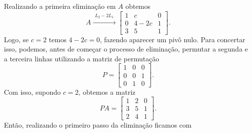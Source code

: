 \documentclass[leqno]{article}
\numberwithin{equation}{section}
\begin{document}
\begin{enumerate}
\begin{enumerate}
                    \begin{sol} 
                        Realizando a primeira eliminação em \( A \) obtemos
                        \begin{equation*}
                            A
                            \xrightarrow{
                                \begin{array}{l}
                                    L_{ 2 } - 2 L_{ 1 }
                                \end{array}
                            }
                            \begin{bmatrix}
                                1 & c & 0  \\
                                0 & 4 - 2 c & 1  \\
                                3 & 5 & 1 
                            \end{bmatrix}
                        .\end{equation*}
                        Logo, se \( c = 2 \) temos \( 4 - 2c = 0 \), fazendo aparecer um pivô nulo.
                        Para concertar isso, podemos, antes de começar o processo de eliminação, permutar a segunda e a terceira linhas utilizando a matriz de permutação
                        \begin{equation*}
                            P =
                            \begin{bmatrix}
                                1 & 0 & 0 \\
                                0 & 0 & 1 \\
                                0 & 1 & 0
                            \end{bmatrix}
                        .\end{equation*}
                        Com isso, supondo \( c = 2 \), obtemos a matriz
                        \begin{equation*}
                            PA =
                            \begin{bmatrix}
                                1 & 2 & 0 \\
                                3 & 5 & 1 \\
                                2 & 4 & 1
                            \end{bmatrix}
                        .\end{equation*}
                        Então, realizando o primeiro passo da eliminação ficamos com

\end{sol}
\end{enumerate}
\end{enumerate}
\end{document}
